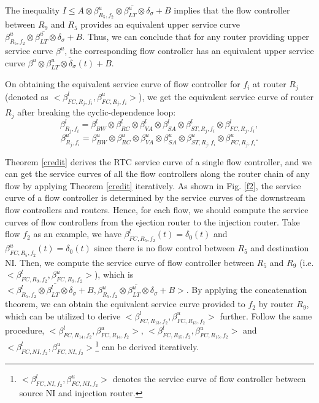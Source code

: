 \documentclass[10pt,journal]{IEEEtran}
\begin{document}
\begin{IEEEproof}
The inequality $I\leq A\otimes \overline{\beta_{R_5,f_2}^u\otimes\beta_{LT}^u\otimes\delta_\sigma+B}$ implies that the flow controller between $R_9$ and $R_5$ provides an equivalent upper service curve $\overline{\beta_{R_5,f_2}^u\otimes\beta_{LT}^u\otimes\delta_\sigma+B}$. Thus, we can conclude that for any router providing upper service curve $\beta^u$, the corresponding flow controller has an equivalent upper service curve $\overline{\beta^u\otimes\beta_{LT}^u\otimes\delta_\sigma(t)+B}$.
\end{IEEEproof}

On obtaining the equivalent service curve of flow controller for $f_i$ at router $R_j$ (denoted as $<\beta_{FC,R_j,f_i}^l,\beta_{FC,R_j,f_i}^u>$), we get the equivalent service curve of router $R_j$ after breaking the cyclic-dependence loop:
$$\beta_{R_j,f_i}^l=\beta_{BW}^l\otimes\beta_{RC}^l\otimes\beta_{VA}^l\otimes\beta_{SA}^l\otimes\beta_{ST,R_j,f_i}^l\otimes\beta_{FC,R_j,f_i}^l,$$
$$\beta_{R_j,f_i}^u=\beta_{BW}^u\otimes\beta_{RC}^u\otimes\beta_{VA}^u\otimes\beta_{SA}^u\otimes\beta_{ST,R_j,f_i}^u\otimes\beta_{FC,R_j,f_i}^u.$$

Theorem \ref{credit} derives the RTC service curve of a single flow controller, and we can get the service curves of all the flow controllers along the router chain of any flow by applying Theorem \ref{credit} iteratively. As shown in Fig. \ref{f2}, the service curve of a flow controller is determined by the service curves of the downstream flow controllers and routers. Hence, for each flow, we should compute the service curves of flow controllers from the ejection router to the injection router. Take flow $f_2$ as an example, we have $\beta_{FC,R_5,f_2}^l(t)=\delta_0(t)$ and $\beta_{FC,R_5,f_2}^u(t)=\delta_0(t)$ since there is no flow control between $R_5$ and destination NI. Then, we compute the service curve of flow controller between $R_5$ and $R_{9}$ (i.e. $<\beta_{FC,R_9,f_2}^l,\beta_{FC,R_9,f_2}^u>$), which is $<\overline{\beta_{R_5,f_2}^l\otimes\beta_{LT}^l\otimes\delta_\sigma+B},\overline{\beta_{R_5,f_2}^u\otimes\beta_{LT}^u\otimes\delta_\sigma+B}>$. By applying the concatenation theorem, we can obtain the equivalent service curve provided to $f_2$ by router $R_{9}$, which can be utilized to derive $<\beta_{FC,R_{13},f_2}^l,\beta_{FC,R_{13},f_2}^u>$ further. Follow the same procedure, $<\beta_{FC,R_{14},f_2}^l,\beta_{FC,R_{14},f_2}^u>$, $<\beta_{FC,R_{15},f_2}^l,\beta_{FC,R_{15},f_2}^u>$ and $<\beta_{FC,NI,f_2}^l,\beta_{FC,NI,f_2}^u>$\footnote{$<\beta_{FC,NI,f_2}^l,\beta_{FC,NI,f_2}^u>$ denotes the service curve of flow controller between source NI and injection router.} can be derived iteratively.
\end{document}
